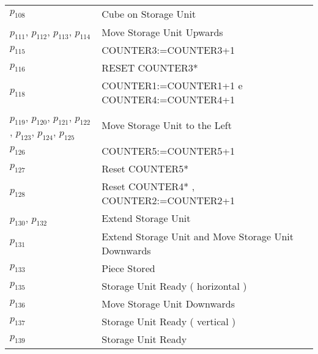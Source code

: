 \begin{longtable}{M{5cm}M{10cm}}
\hyperlink{completeNet:p108}{\hypertarget{completeTable:p108}{$p_{108}$}} & Cube on Storage Unit\\
\hyperlink{completeNet:p111}{\hypertarget{completeTable:p111}{$p_{111}$}}, \hyperlink{completeNet:p112}{\hypertarget{completeTable:p112}{$p_{112}$}}, \hyperlink{completeNet:p113}{\hypertarget{completeTable:p113}{$p_{113}$}}, \hyperlink{completeNet:p114}{\hypertarget{completeTable:p114}{$p_{114}$}} & Move Storage Unit Upwards\\
\hyperlink{completeNet:p115}{\hypertarget{completeTable:p115}{$p_{115}$}} & COUNTER3:=COUNTER3+1\\
\hyperlink{completeNet:p116}{\hypertarget{completeTable:p116}{$p_{116}$}} & RESET COUNTER3*\\
\hyperlink{completeNet:p118}{\hypertarget{completeTable:p118}{$p_{118}$}} & COUNTER1:=COUNTER1+1 e COUNTER4:=COUNTER4+1\\
\hyperlink{completeNet:p119}{\hypertarget{completeTable:p119}{$p_{119}$}}, \hyperlink{completeNet:p120}{\hypertarget{completeTable:p120}{$p_{120}$}}, \hyperlink{completeNet:p121}{\hypertarget{completeTable:p121}{$p_{121}$}}, \hyperlink{completeNet:p122}{\hypertarget{completeTable:p122}{$p_{122}$}}, \hyperlink{completeNet:p123}{\hypertarget{completeTable:p123}{$p_{123}$}}, \hyperlink{completeNet:p124}{\hypertarget{completeTable:p124}{$p_{124}$}}, \hyperlink{completeNet:p125}{\hypertarget{completeTable:p125}{$p_{125}$}} & Move Storage Unit to the Left\\
\hyperlink{completeNet:p126}{\hypertarget{completeTable:p126}{$p_{126}$}} & COUNTER5:=COUNTER5+1\\
\hyperlink{completeNet:p127}{\hypertarget{completeTable:p127}{$p_{127}$}} & Reset COUNTER5*\\
\hyperlink{completeNet:p128}{\hypertarget{completeTable:p128}{$p_{128}$}} & Reset COUNTER4* , COUNTER2:=COUNTER2+1\\
\hyperlink{completeNet:p130}{\hypertarget{completeTable:p130}{$p_{130}$}}, \hyperlink{completeNet:p132}{\hypertarget{completeTable:p132}{$p_{132}$}} & Extend Storage Unit\\
\hyperlink{completeNet:p131}{\hypertarget{completeTable:p131}{$p_{131}$}} & Extend Storage Unit and Move Storage Unit Downwards\\
\hyperlink{completeNet:p133}{\hypertarget{completeTable:p133}{$p_{133}$}} & Piece Stored\\
\hyperlink{completeNet:p135}{\hypertarget{completeTable:p135}{$p_{135}$}} & Storage Unit Ready ( horizontal )\\
\hyperlink{completeNet:p136}{\hypertarget{completeTable:p136}{$p_{136}$}} & Move Storage Unit Downwards\\
\hyperlink{completeNet:p137}{\hypertarget{completeTable:p137}{$p_{137}$}} & Storage Unit Ready ( vertical )\\
\hyperlink{completeNet:p139}{\hypertarget{completeTable:p139}{$p_{139}$}} & Storage Unit Ready\\
\end{longtable}

